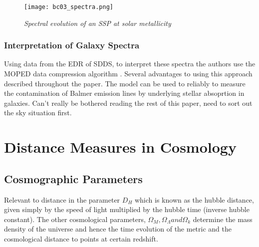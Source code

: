 \documentclass{literature}
\begin{document}
\begin{figure}[!htp]
\centering
\texttt{[image: bc03\_spectra.png]}
\caption{\footnotesize{\emph{Spectral evolution of an SSP at solar metallicity}}}
\label{fig:BC03_spectra}
\end{figure} 


\subsubsection{Interpretation of Galaxy Spectra}
Using data from the EDR of SDDS, to interpret these spectra the authors use the MOPED data compression algorithm \citep{Heavens_2000}. Several advantages to using this approach described throughout the paper. The model can be used to reliably to measure the contamination of Balmer emission lines by underlying stellar absoprtion in galaxies. Can't really be bothered reading the rest of this paper, need to sort out the sky situation first.   


\section{Distance Measures in Cosmology}\label{sec:cosmology_distance}
\subsection{Cosmographic Parameters}
Relevant to distance in the parameter $D_{H}$ which is known as the hubble distance, given simply by the speed of light multiplied by the hubble time (inverse hubble constant). The other cosmological parameters, $\Omega_{M}, \Omega_{\Lambda} and \Omega_{k}$ determine the mass density of the universe and hence the time evolution of the metric and the cosmological distance to points at certain redshift.
\end{document}
